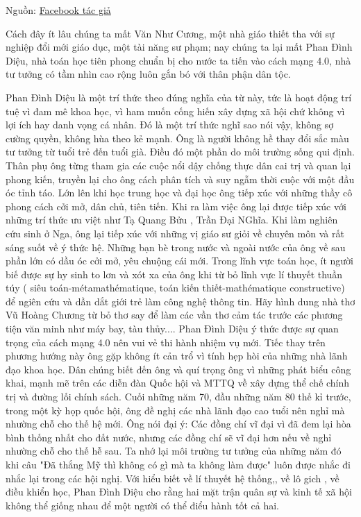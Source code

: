 Nguồn: \href{https://www.facebook.com/truongquang.de/posts/1795899743799506}{Facebook tác giả}

Cách đây ít lâu chúng ta mất Văn Như Cương, một nhà giáo thiết tha với sự nghiệp đổi mới giáo dục, một tài năng sư phạm; nay chúng ta lại mất Phan Đình Diệu, nhà toán học tiên phong chuẩn bị cho nước ta tiến vào cách mạng 4.0, nhà tư tưởng có tầm nhìn cao rộng luôn gắn bó với thân phận dân tộc.

Phan Đình Diệu là một trí thức theo đúng nghĩa của từ này, tức là hoạt động trí tuệ vì đam mê khoa học, vì ham muốn cống hiến xây dựng xã hội chứ không vì lợi ích hay danh vọng cá nhân. Đó là một trí thức nghĩ sao nói vậy, không sợ cường quyền, không hùa theo kẻ mạnh. Ông là người không hề thay đổi sắc màu tư tưởng từ tuổi trẻ đến tuổi già. Điều đó một phần do môi trường sống qui định. Thân phụ ông từng tham gia các cuộc nổi dậy chống thực dân cai trị và quan lại phong kiến, truyền lại cho ông cách phân tích và suy ngẫm thời cuộc với một đầu óc tỉnh táo. Lớn lên khi học trung học và đại học ông tiếp xúc với những thầy cô phong cách cởi mở, dân chủ, tiên tiến. Khi ra làm việc ông lại được tiếp xúc với những trí thức ưu việt như Tạ Quang Bửu , Trần Đại NGhĩa. Khi làm nghiên cứu sinh ở Nga, ông lại tiếp xúc với những vị giáo sư giỏi về chuyên môn và rất sáng suốt về  ý thức hệ. Những bạn bè trong nước và ngoài nước của ông về sau phần lớn có dầu óc cởi mở, yêu chuộng cái mới. Trong lĩnh vực toán học, ít người biế được sự hy sinh to lơn và xót xa của ông khi từ bỏ lĩnh vực lí thuyết thuần túy ( siêu toán-métamathématique, toán kiến thiết-mathématique  constructive) để ngiên cứu và dần dắt giới trẻ làm công nghệ thông tin. Hãy hình dung nhà thơ Vũ Hoàng Chương từ bỏ thơ say để làm các vần thơ cảm tác trước các phương tiện văn minh như máy bay, tàu thủy.... Phan Đình Diệu ý thức được sự quan trọng của cách mạng 4.0 nên vui vẻ thi hành nhiệm vụ mới. Tiếc thay trên phương hướng này ông gặp không ít cản trổ vì tính hẹp hòi của những nhà lãnh đạo khoa học. Dân chúng biết đến ông và quí trọng ông vì những phát biểu công khai, mạnh mẽ trên các diễn đàn Quốc hội và MTTQ về xây dựng thể chế chính trị và đường lối chính sách. Cuối những năm 70, đầu những năm 80 thế kỉ trước, trong một kỳ họp quốc hội, ông đề nghị các nhà lãnh đạo cao tuổi nên nghỉ mà nhường chỗ cho thế hệ mới. Ông nói đại ý: Các đồng chí vĩ đại vì đã đem lại hòa bình thống nhất cho đất nước, nhưng các đồng chí sẽ vĩ đại hơn nếu về nghỉ nhường chỗ cho thế hễ sau. Ta nhớ lại môi trường tư tưởng của những năm đó khi câu "Đã thắng Mỹ thì không có gì mà ta không làm được" luôn được nhắc đi nhắc lại trong các hội nghị. Với hiểu biết về lí thuyết hệ thống,, về lô gich , về điều khiển học, Phan Đình Diệu cho rằng hai mặt trận quân sự và kinh tế xã hội không thể giống nhau để một người có thể điểu hành tốt cả hai.

